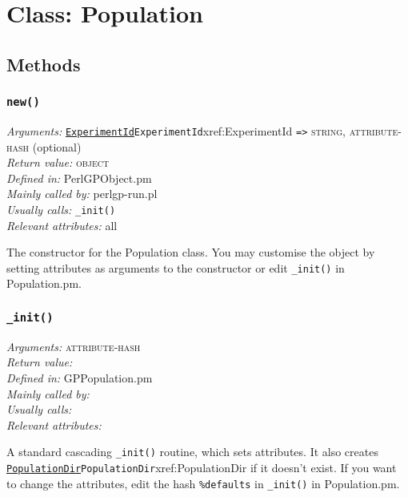 \documentclass[a4paper]{article}
\begin{document}
\section{Class: Population}\label{Population}
\subsection{Methods}

\subsubsection{\texttt{new()}}\label{Population::new}
\begin{flushleft}
\textit{Arguments:} \hyperref[no]{\texttt{ExperimentId}}{\texttt{ExperimentId}}{xref:ExperimentId} \verb:=>: \textsc{string}, \textsc{attribute-hash} (optional)\\
\textit{Return value:} \textsc{object}\\
\textit{Defined in:} PerlGPObject.pm\\
\textit{Mainly called by:} perlgp-run.pl\\
\textit{Usually calls:} \texttt{\_init()}\\
\textit{Relevant attributes:} all
\end{flushleft}

The constructor for the Population class.  You may customise the
object by setting attributes as arguments to the constructor
or edit \texttt{\_init()} in Population.pm.

\subsubsection{\texttt{\_init()}}\label{Population::_init}
\begin{flushleft}
\textit{Arguments:} \textsc{attribute-hash}\\
\textit{Return value:} \\
\textit{Defined in:} GPPopulation.pm\\
\textit{Mainly called by:} \\
\textit{Usually calls:} \\
\textit{Relevant attributes:}
\end{flushleft}

A standard cascading \texttt{\_init()} routine, which sets attributes.
It also creates \hyperref[no]{\texttt{PopulationDir}}{\texttt{PopulationDir}}{xref:PopulationDir} if it doesn't exist.  If you
want to change the attributes, edit the hash \texttt{\%defaults} in
\texttt{\_init()} in Population.pm.
\end{document}
